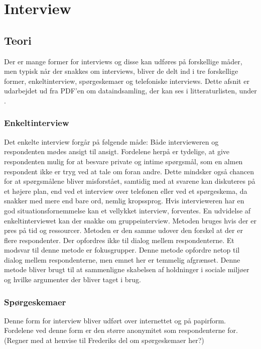\chapter{Interview}

\section{Teori}
Der er mange former for interviews og disse kan udføres på forskellige måder, men typisk når der snakkes om interviews, bliver de delt ind i tre forskellige former, enkeltinterview, spørgeskemaer og telefoniske interviews.
Dette afsnit er udarbejdet ud fra PDF'en om dataindsamling, der kan ses i litteraturlisten, under \citep{metodeogprojektskrivning}.

\subsection{Enkeltinterview}
Det enkelte interview forgår på følgende måde: Både intervieweren og respondenten mødes ansigt til ansigt. Fordelene herpå er tydelige, at give respondenten mulig for at besvare private og intime spørgsmål, som en almen respondent ikke er tryg ved at tale om foran andre. Dette mindsker også chancen for at spørgsmålene bliver misforstået, samtidig med at svarene kan diskuteres på et højere plan, end ved et interview over telefonen eller ved et spørgeskema, da snakker med mere end bare ord, nemlig kropssprog. Hvis intervieweren har en god situationsfornemmelse kan et vellykket interview, forventes. 
En udvidelse af enkeltinterviewet kan der snakke om gruppeinterview. Metoden bruges hvis der er pres på tid og ressourcer. Metoden er den samme udover den forskel at der er flere respondenter. Der opfordres ikke til dialog mellem respondenterne. Et modsvar til denne metode er fokusgrupper. Denne metode opfordre netop til dialog mellem respondenterne, men emnet her er temmelig afgrænset. Denne metode bliver brugt til at sammenligne skabelsen af holdninger i sociale miljøer og hvilke argumenter der bliver taget i brug. 

\subsection{Spørgeskemaer}
Denne form for interview bliver udført over internettet og på papirform. Fordelene ved denne form er den større anonymitet som respondenterne for. (Regner med at henvise til Frederiks del om spørgeskemaer her?)

